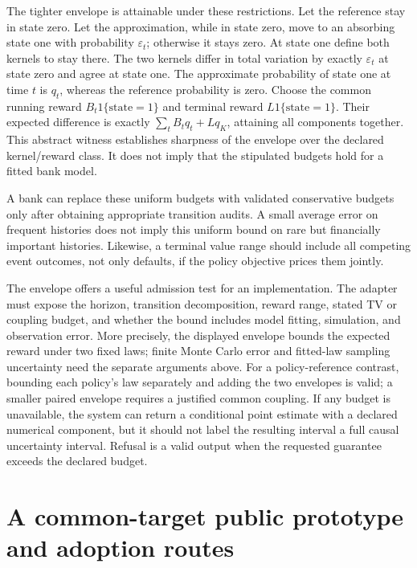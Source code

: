 The tighter envelope is attainable under these restrictions. Let the
reference stay in state zero. Let the approximation, while in state zero,
move to an absorbing state one with probability $\varepsilon_t$; otherwise
it stays zero. At state one define both kernels to stay there. The two
kernels differ in total variation by exactly $\varepsilon_t$ at state zero
and agree at state one. The approximate probability of state one at time
$t$ is $q_t$, whereas the reference probability is zero. Choose the common
running reward $B_t1\{\text{state}=1\}$ and terminal reward
$L1\{\text{state}=1\}$. Their expected difference is exactly
$\sum_tB_tq_t+Lq_K$, attaining all components together. This abstract witness
establishes sharpness of the envelope over the declared kernel/reward class.
It does not imply that the stipulated budgets hold for a fitted bank model.
\citep{exec17_s5_joint_error}

A bank can replace these
uniform budgets with validated conservative budgets only after obtaining
appropriate transition audits. A small average error on frequent histories
does not imply this uniform bound on rare but financially important histories.
Likewise, a terminal value range should include all competing event outcomes,
not only defaults, if the policy objective prices them jointly.

The envelope offers a useful admission test for an implementation. The
adapter must expose the horizon, transition decomposition, reward range,
stated TV or coupling budget, and whether the bound includes model fitting,
simulation, and observation error. More precisely, the displayed envelope
bounds the expected reward under two fixed laws; finite Monte Carlo error
and fitted-law sampling uncertainty need the separate arguments above.
For a policy-reference contrast, bounding each policy's law separately and
adding the two envelopes is valid; a smaller paired envelope requires a
justified common coupling. If any budget is unavailable, the system
can return a conditional point estimate with a declared numerical component,
but it should not label the resulting interval a full causal uncertainty
interval. Refusal is a valid output when the requested guarantee exceeds the
declared budget.

\section{A common-target public prototype and adoption routes}
\label{exec17:s5-adoption}

